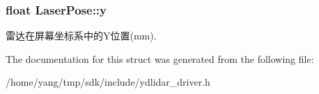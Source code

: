 \subsubsection[{\texorpdfstring{y}{y}}]{\setlength{\rightskip}{0pt plus 5cm}float Laser\+Pose\+::y}\hypertarget{struct_laser_pose_aaf1e1a4755babfaa45c64dd3e01b2c2d}{}\label{struct_laser_pose_aaf1e1a4755babfaa45c64dd3e01b2c2d}
雷达在屏幕坐标系中的\+Y位置(mm). 

The documentation for this struct was generated from the following file\+:\begin{DoxyCompactItemize}
\item 
/home/yang/tmp/sdk/include/ydlidar\+\_\+driver.\+h\end{DoxyCompactItemize}
